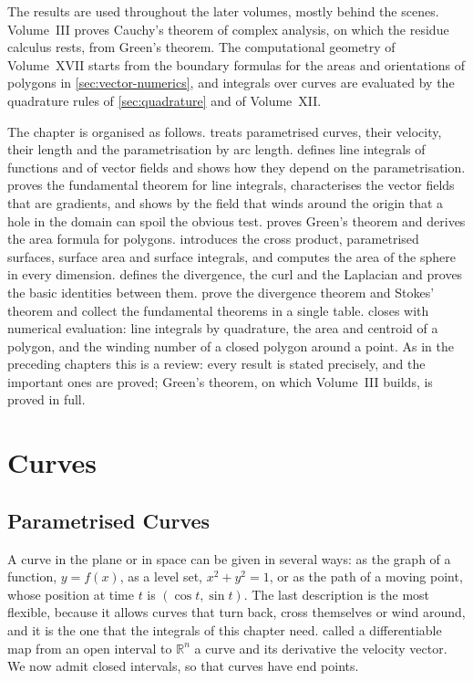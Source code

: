 The results are used throughout the later volumes, mostly behind the scenes. Volume~III proves Cauchy's theorem of complex analysis, on which the residue calculus rests, from Green's theorem. The computational geometry of Volume~XVII starts from the boundary formulas for the areas and orientations of polygons in \cref{sec:vector-numerics}, and integrals over curves are evaluated by the quadrature rules of \cref{sec:quadrature} and of Volume~XII.

The chapter is organised as follows.  treats parametrised curves, their velocity, their length and the parametrisation by arc length.  defines line integrals of functions and of vector fields and shows how they depend on the parametrisation.  proves the fundamental theorem for line integrals, characterises the vector fields that are gradients, and shows by the field that winds around the origin that a hole in the domain can spoil the obvious test.  proves Green's theorem and derives the area formula for polygons.  introduces the cross product, parametrised surfaces, surface area and surface integrals, and computes the area of the sphere in every dimension.  defines the divergence, the curl and the Laplacian and proves the basic identities between them.  prove the divergence theorem and Stokes' theorem and collect the fundamental theorems in a single table.  closes with numerical evaluation: line integrals by quadrature, the area and centroid of a polygon, and the winding number of a closed polygon around a point. As in the preceding chapters this is a review: every result is stated precisely, and the important ones are proved; Green's theorem, on which Volume~III builds, is proved in full.

\section{Curves}
\label{sec:curves}

\subsection{Parametrised Curves}

A curve in the plane or in space can be given in several ways: as the graph of a function, $y=f(x)$, as a level set, $x^2+y^2=1$, or as the path of a moving point, whose position at time $t$ is $(\cos t,\sin t)$. The last description is the most flexible, because it allows curves that turn back, cross themselves or wind around, and it is the one that the integrals of this chapter need.  called a differentiable map from an open interval to $\mathbb R^n$ a curve and its derivative the velocity vector. We now admit closed intervals, so that curves have end points.

